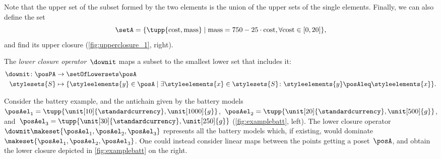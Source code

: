 Note that the upper set of the subset formed by the two elements is the union of the upper sets of the single elements.
%
Finally, we can also define the set
%
\begin{equation}
	\setA=\{
	\tupp{\text{cost},\text{mass}}\mid \text{mass}=750-25\cdot \text{cost},
	\forall \text{cost} \in [0,20]
	\},
\end{equation}
%
and find its upper closure (\cref{fig:upperclosure_1}, right).
%
\begin{figure*}[h!]
	\centering
	\hfill
	\hfill
	\caption{Example of uppler closure for different sets of battery choices.}
	\label{fig:upperclosure_1}
\end{figure*}

\begin{definition}
	\label{def:lowerclosure}
	The \emph{lower closure operator}~$\downit$ maps a subset to the smallest lower set that includes it:
	\begin{equation*}
		\begin{aligned}
			\downit \colon \posPA & \to \setOfLowersets   \posA                                                                                                                 \\
			\stylesets{S}         & \mapsto \{ \styleelements{y}\in \posA \mid \exists \styleelements{x}\in \stylesets{S} \colon \styleelements{y}\posAleq \styleelements{x}\}.
		\end{aligned}
	\end{equation*}
\end{definition}

Consider the battery example, and the antichain given by the battery models~$\posAel_1=\tupp{\unit[10]{\standardcurrency},\unit[1000]{g}}$,~$\posAel_2=\tupp{\unit[20]{\standardcurrency},\unit[500]{g}}$, and~$\posAel_3=\tupp{\unit[30]{\standardcurrency},\unit[250]{g}}$ (\cref{fig:examplebatt}, left).
The lower closure operator~$\downit\makeset{\posAel_1,\posAel_2,\posAel_3}$ represents all the battery models which, if existing, would dominate~$\makeset{\posAel_1,\posAel_2,\posAel_3}$.
One could instead consider linear maps between the points getting a poset~$\posA$, and obtain the lower closure depicted in \cref{fig:examplebatt} on the right.

\begin{figure*}[h!]
	\centering
	\hfill
	\hfill
	\caption{Example of lower closures.}
	\label{fig:examplebatt}
\end{figure*}

